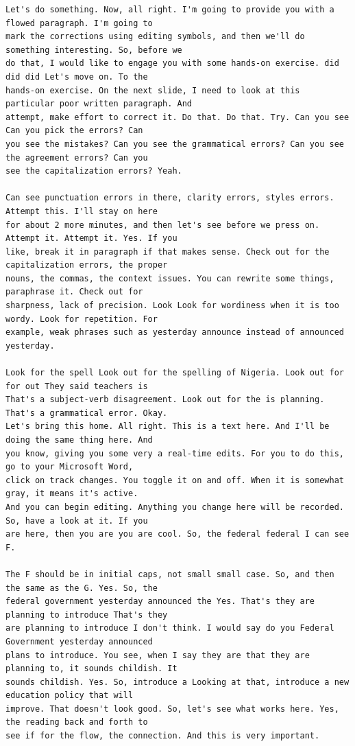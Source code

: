 {\begin{Verbatim}
Let's do something. Now, all right. I'm going to provide you with a flowed paragraph. I'm going to
mark the corrections using editing symbols, and then we'll do something interesting. So, before we
do that, I would like to engage you with some hands-on exercise. did did did Let's move on. To the
hands-on exercise. On the next slide, I need to look at this particular poor written paragraph. And
attempt, make effort to correct it. Do that. Do that. Try. Can you see Can you pick the errors? Can
you see the mistakes? Can you see the grammatical errors? Can you see the agreement errors? Can you
see the capitalization errors? Yeah.

Can see punctuation errors in there, clarity errors, styles errors. Attempt this. I'll stay on here
for about 2 more minutes, and then let's see before we press on. Attempt it. Attempt it. Yes. If you
like, break it in paragraph if that makes sense. Check out for the capitalization errors, the proper
nouns, the commas, the context issues. You can rewrite some things, paraphrase it. Check out for
sharpness, lack of precision. Look Look for wordiness when it is too wordy. Look for repetition. For
example, weak phrases such as yesterday announce instead of announced yesterday.

Look for the spell Look out for the spelling of Nigeria. Look out for for out They said teachers is
That's a subject-verb disagreement. Look out for the is planning. That's a grammatical error. Okay.
Let's bring this home. All right. This is a text here. And I'll be doing the same thing here. And
you know, giving you some very a real-time edits. For you to do this, go to your Microsoft Word,
click on track changes. You toggle it on and off. When it is somewhat gray, it means it's active.
And you can begin editing. Anything you change here will be recorded. So, have a look at it. If you
are here, then you are you are cool. So, the federal federal I can see F.

The F should be in initial caps, not small small case. So, and then the same as the G. Yes. So, the
federal government yesterday announced the Yes. That's they are planning to introduce That's they
are planning to introduce I don't think. I would say do you Federal Government yesterday announced
plans to introduce. You see, when I say they are that they are planning to, it sounds childish. It
sounds childish. Yes. So, introduce a Looking at that, introduce a new education policy that will
improve. That doesn't look good. So, let's see what works here. Yes, the reading back and forth to
see if for the flow, the connection. And this is very important.


\end{Verbatim}}
